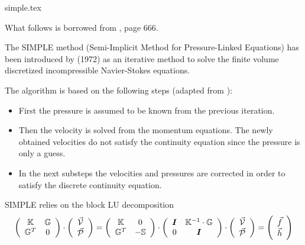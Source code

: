 \begin{flushright} {\tiny {\color{gray} simple.tex}} \end{flushright}


What follows is borrowed from , page 666. 

The SIMPLE method (Semi-Implicit Method for Pressure-Linked Equations)
has been introduced by \textcite{pasp72} (1972) as an iterative method to solve
the finite volume discretized incompressible Navier-Stokes equations. 

The algorithm is based on the following steps (adapted from \cite{eche13}):
\begin{itemize}
\item First the pressure is assumed to be known from the previous iteration.
\item Then the velocity is solved from the momentum equations. The newly obtained
velocities do not satisfy the continuity equation since the pressure is only a
guess.
\item In the next substeps the velocities and pressures are corrected in order to
satisfy the discrete continuity equation.
\end{itemize}

SIMPLE relies on the block LU decomposition
\begin{equation}
\left(\begin{array}{cc}
{\mathbb{K}} & {\mathbb{G}} \\ {\mathbb{G}}^T & 0  
\end{array}\right)
\cdot
\left(\begin{array}{c}
\vec{\cal V} \\ \vec{\cal P}
\end{array}\right)
=
\left(\begin{array}{cc}
{\mathbb{K}} & 0 \\ {\mathbb{G}}^T & -{\mathbb{S}}
\end{array}\right)
\cdot
\left(\begin{array}{cc}
{\bm I} & {\mathbb{K}}^{-1} \cdot {\mathbb{G}} \\
0 & {\bm I} 
\end{array}\right)
\cdot
\left(\begin{array}{c}
\vec{\cal V} \\ \vec{\cal P}
\end{array}\right)
=
\left(\begin{array}{c}
\vec{f} \\ \vec{h}
\end{array}\right)
\end{equation}

